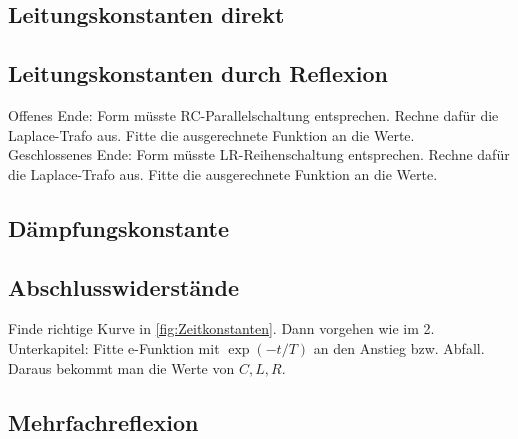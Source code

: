 \subsection{Leitungskonstanten direkt}
\clearpage
\subsection{Leitungskonstanten durch Reflexion}
Offenes Ende: Form müsste RC-Parallelschaltung entsprechen. Rechne dafür die Laplace-Trafo aus. Fitte die ausgerechnete Funktion an die Werte. \\
Geschlossenes Ende: Form müsste LR-Reihenschaltung entsprechen. Rechne dafür die Laplace-Trafo aus. Fitte die ausgerechnete Funktion an die Werte.
\subsection{Dämpfungskonstante}

\subsection{Abschlusswiderstände}
Finde richtige Kurve in \ref{fig:Zeitkonstanten}. Dann vorgehen wie im 2. Unterkapitel: Fitte e-Funktion mit $\exp(-t/T)$ an den Anstieg bzw. Abfall. Daraus bekommt man die Werte von $C,L,R$.
\clearpage
\subsection{Mehrfachreflexion}

